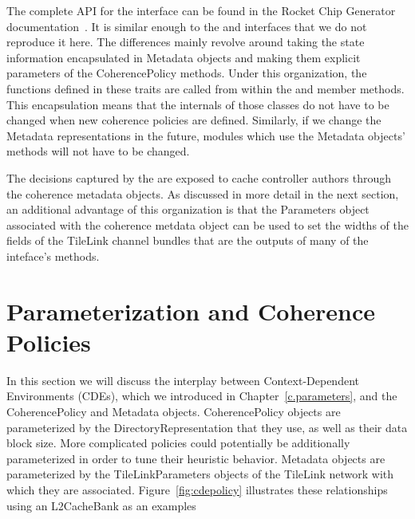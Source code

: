 The complete API for the  interface can be found in the
Rocket Chip Generator documentation~\cite{rocket}.
It is similar enough to the  and  interfaces that
we do not reproduce it here.
The differences mainly revolve around taking the state information encapsulated
in Metadata objects and making them explicit parameters of the CoherencePolicy methods.
Under this organization, the functions defined in these traits
are called from within the  and  member methods.
This encapsulation means that the internals of those classes do not have to be changed
when new coherence policies are defined.
Similarly, if we change the Metadata representations in the future,
modules which use the Metadata objects' methods will not have to be changed.

The decisions captured by the  are exposed to cache controller authors through
the coherence metadata objects.
As discussed in more detail in the next section,
an additional advantage of this organization is that the Parameters object
associated with the coherence metdata object can be used to set the widths of the fields of the
TileLink channel bundles that are the outputs of many of the inteface's methods.

\section{Parameterization and Coherence Policies}

In this section we will discuss the interplay between Context-Dependent Environments (CDEs),
which we introduced in Chapter~\ref{c.parameters},
and the CoherencePolicy and Metadata objects.
CoherencePolicy objects are parameterized by the DirectoryRepresentation that they use,
as well as their data block size.
More complicated policies could potentially be additionally parameterized in order to tune their heuristic behavior.
Metadata objects are parameterized by the TileLinkParameters objects of the TileLink network with which they are associated.
Figure~\ref{fig:cdepolicy} illustrates these relationships using an L2CacheBank as an examples

